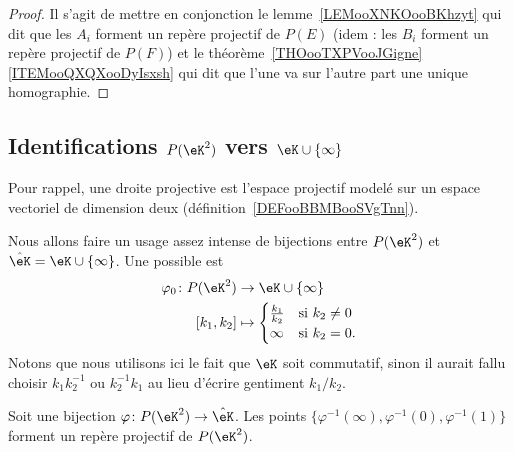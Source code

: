 \begin{proof}
	Il s'agit de mettre en conjonction le lemme~\ref{LEMooXNKOooBKhzyt} qui dit que les \( A_i\) forment un repère projectif de \( P(E)\) (idem : les \( B_i\) forment un repère projectif de \( P(F)\)) et le théorème~\ref{THOooTXPVooJGigne}\ref{ITEMooQXQXooDyIsxsh} qui dit que l'une va sur l'autre part une unique homographie.
\end{proof}

\subsection{Identifications \texorpdfstring{\(  P(\eK^2)\)}{P(K2)} vers \texorpdfstring{\(  \eK\cup\{ \infty \}\)}{K u infinity}}

Pour rappel, une droite projective est l'espace projectif modelé sur un espace vectoriel de dimension deux (définition~\ref{DEFooBBMBooSVgTnn}).

\begin{normaltext}      \label{NORMooUQRUooOMIzJD}
	Nous allons faire un usage assez intense de bijections entre \( P(\eK^2)\) et \( \hat\eK=\eK\cup\{ \infty \}\). Une possible est
	\begin{equation}        \label{EQooSIJDooTHPYMb}
		\begin{aligned}
			\varphi_0\colon P(\eK^2) & \to \eK\cup\{ \infty \}                            \\
			[k_1,k_2]                & \mapsto \begin{cases}
				                                   \frac{ k_1 }{ k_2 } & \text{si } k_2\neq 0 \\
				                                   \infty              & \text{si } k_2=0.
			                                   \end{cases}
		\end{aligned}
	\end{equation}
	Notons que nous utilisons ici le fait que \( \eK\) soit commutatif, sinon il aurait fallu choisir \( k_1k_2^{-1}\) ou \( k_2^{-1}k_1\) au lieu d'écrire gentiment \( k_1/k_2\).
\end{normaltext}

\begin{corollary}       \label{CORooFJSCooNOeAel}
	Soit une bijection \( \varphi\colon P(\eK^2)\to \hat\eK\). Les points \( \{ \varphi^{-1}(\infty), \varphi^{-1}(0), \varphi^{-1}(1) \}\) forment un repère projectif de \( P(\eK^2)\).
\end{corollary}


